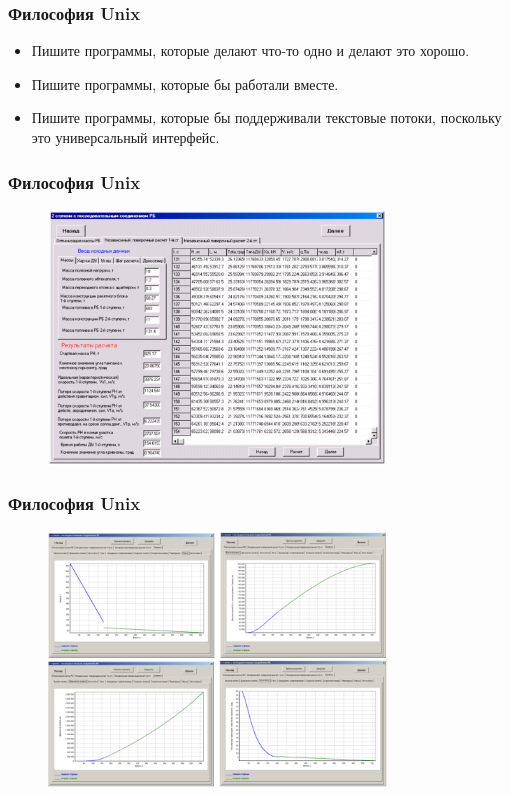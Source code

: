 \documentclass[12pt, compress]{beamer}
\begin{document}
\begin{frame}[c]
\frametitle{Философия Unix}
\begin{itemize}
  \item Пишите программы, которые делают что-то одно и делают это хорошо.
  \item Пишите программы, которые бы работали вместе.
  \item Пишите программы, которые бы поддерживали текстовые потоки, поскольку это универсальный интерфейс.   
\end{itemize}        
\end{frame}

\begin{frame}[t]
\frametitle{Философия Unix}
\begin{figure}[htbp]  
  \includegraphics[width=0.8\textwidth]{not_unix_way1.png}
\end{figure}
\end{frame}

\begin{frame}[t]
\frametitle{Философия Unix}
\begin{figure}[htbp]  
  \includegraphics[width=0.8\textwidth]{not_unix_way2.png}
\end{figure}
\end{frame}
\end{document}

